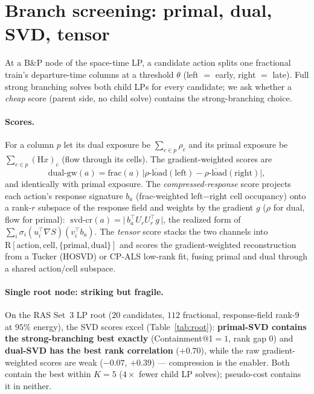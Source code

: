 \documentclass[11pt]{article}
\newcommand{\rss}{\mathrm{R}}
\begin{document}
\section{Branch screening: primal, dual, SVD, tensor}\label{sec:screen}
At a B\&P node of the space-time LP, a candidate action splits one fractional train's
departure-time columns at a threshold $\theta$ (left $=$ early, right $=$ late). Full strong
branching solves both child LPs for every candidate; we ask whether a \emph{cheap} score
(parent side, no child solve) contains the strong-branching choice.

\paragraph{Scores.} For a column $p$ let its dual exposure be $\sum_{c\in p}\rho_c$ and its
primal exposure be $\sum_{c\in p}(\mathrm{H}x)_c$ (flow through its cells). The
gradient-weighted scores are
\[
\text{dual-gw}(a)=\text{frac}(a)\,\big|\overline{\rho\text{-load}}(\text{left})-\overline{\rho\text{-load}}(\text{right})\big|,
\]
and  identically with primal exposure. The \emph{compressed-response} score
projects each action's response signature $b_a$ (frac-weighted left$-$right cell occupancy)
onto a rank-$r$ subspace of the response field and weights by the gradient
$g$ ($\rho$ for dual, flow for primal):
$\;\text{svd-cr}(a)=\big|\,b_a^\top U_r U_r^\top g\,\big|$, the realized form of
$\sum_i \sigma_i (u_i^\top\nabla S)(v_i^\top b_a)$. The \emph{tensor} score stacks the two
channels into $\rss[\text{action},\text{cell},\{\text{primal},\text{dual}\}]$ and scores the
gradient-weighted reconstruction from a Tucker (HOSVD) or CP-ALS low-rank fit, fusing primal
and dual through a shared action/cell subspace.

\paragraph{Single root node: striking but fragile.} On the RAS Set~3 LP root ($20$
candidates, $112$ fractional, response-field rank-$9$ at $95\%$ energy), the SVD scores excel
(Table~\ref{tab:root}): \textbf{primal-SVD contains the strong-branching best exactly}
(Containment@1$=1$, rank gap $0$) and \textbf{dual-SVD has the best rank correlation}
($+0.70$), while the raw gradient-weighted scores are weak ($-0.07$, $+0.39$) --- compression
is the enabler. Both contain the best within $K=5$ ($4\times$ fewer child LP solves);
pseudo-cost contains it in neither.
\end{document}
